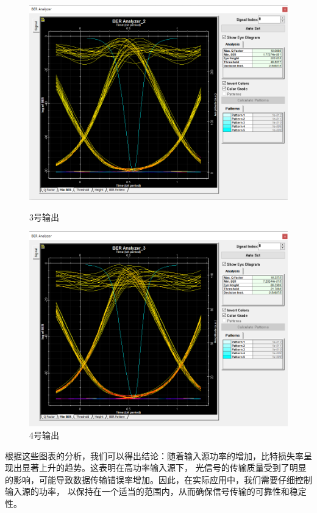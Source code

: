 \documentclass[12pt]{article}
\begin{document}
\begin{figure}[H]
\begin{minipage}[t]{0.5\linewidth}
        \includegraphics[scale=0.5]{sweep2BER3.png}
        \caption{3号输出}
        \label{fig:side:a}
      \end{minipage}%
      \begin{minipage}[t]{0.5\linewidth}
        \centering
        \includegraphics[scale=0.5]{sweep2BER4.png}
        \caption{4号输出}
        \label{fig:side:b}
      \end{minipage}
\end{figure}

根据这些图表的分析，我们可以得出结论：随着输入源功率的增加，比特损失率呈现出显著上升的趋势。这表明在高功率输入源下，
光信号的传输质量受到了明显的影响，可能导致数据传输错误率增加。因此，在实际应用中，我们需要仔细控制输入源的功率，
以保持在一个适当的范围内，从而确保信号传输的可靠性和稳定性。
\end{document}
